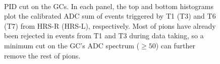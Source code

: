 \begin{figure}[!ht]
  \begin{center}
    \\
    \caption[PID cut on the GCs]{\footnotesize{PID cut on the GCs. In each panel, the top and bottom histograms plot the calibrated ADC sum of events triggered by T1 (T3) and T6 (T7) from HRS-R (HRS-L), respectively. Most of pions have already been rejected in events from T1 and T3 during data taking, so a minimum cut on the GC's ADC spectrum ($\geq 50$) can further remove the rest of pions.}}
    \label{gc_eff}
  \end{center}
\end{figure}

